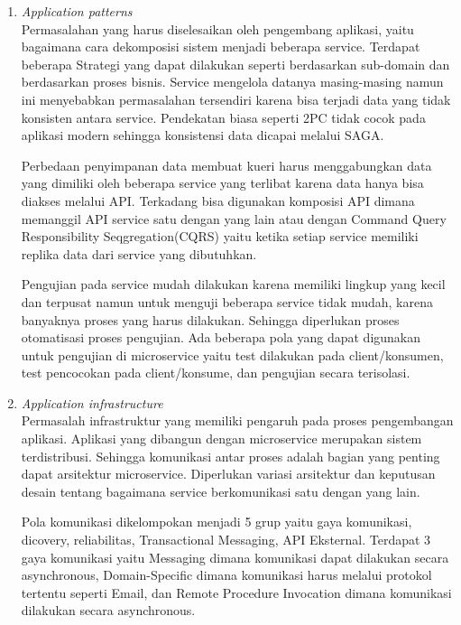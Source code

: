 \begin{enumerate}[leftmargin=1.3cm]
	\item \textit{Application patterns}\\
	Permasalahan yang harus diselesaikan oleh pengembang aplikasi, yaitu bagaimana cara dekomposisi sistem menjadi beberapa service. Terdapat beberapa Strategi yang dapat dilakukan seperti berdasarkan sub-domain dan berdasarkan proses bisnis. Service mengelola datanya masing-masing namun ini menyebabkan permasalahan tersendiri karena bisa terjadi data yang tidak konsisten antara service. Pendekatan biasa seperti 2PC tidak cocok pada aplikasi modern sehingga konsistensi data dicapai melalui SAGA.
	
	Perbedaan penyimpanan data membuat kueri harus menggabungkan data yang dimiliki oleh beberapa service yang terlibat karena data hanya bisa diakses melalui API. Terkadang bisa digunakan komposisi API dimana memanggil API service satu dengan yang lain atau dengan Command Query Responsibility Seqgregation(CQRS) yaitu ketika setiap service memiliki replika data dari service yang dibutuhkan.

	Pengujian pada service mudah dilakukan karena memiliki lingkup yang kecil dan terpusat namun untuk menguji beberapa service tidak mudah, karena banyaknya proses yang harus dilakukan. Sehingga diperlukan proses otomatisasi proses pengujian. Ada beberapa pola yang dapat digunakan untuk pengujian di microservice yaitu test dilakukan pada client/konsumen, test pencocokan pada client/konsume, dan pengujian secara terisolasi.  

	\item \textit{Application infrastructure} \\
	Permasalah infrastruktur yang memiliki pengaruh pada proses pengembangan aplikasi. Aplikasi yang dibangun dengan microservice merupakan sistem terdistribusi. Sehingga komunikasi antar proses adalah bagian yang penting dapat arsitektur microservice. Diperlukan variasi arsitektur dan keputusan desain tentang bagaimana service berkomunikasi satu dengan yang lain. 

	Pola komunikasi dikelompokan menjadi 5 grup yaitu gaya komunikasi, dicovery, reliabilitas, Transactional Messaging, API Eksternal. Terdapat 3 gaya komunikasi yaitu Messaging dimana komunikasi dapat dilakukan secara asynchronous, Domain-Specific dimana komunikasi harus melalui protokol tertentu seperti Email, dan Remote Procedure Invocation dimana komunikasi dilakukan secara asynchronous.
	

\end{enumerate}
